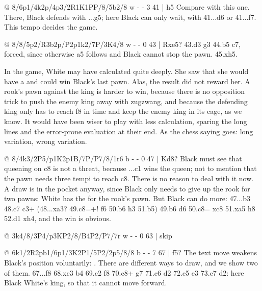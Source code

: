 @ 8/6p1/4k2p/4p3/2R1K1PP/8/5b2/8 w - - 3 41 | h5
Compare  with this one. There, Black defends with ...\K g5; here
Black can only wait, with 41...\K d6 or 41...\K f7. This tempo decides the game.

@ 8/8/5p2/R3b2p/P2p1k2/7P/3K4/8 w - - 0 43 | Rxe5?
43.\K d3 \K g3 44.\R b5 \B c7, forced, since otherwise a5 follows and Black cannot stop the pawn.
45.\R xh5.

In the game, White may have calculated quite deeply. She saw that she would have a
 and could win Black's last
pawn. Alas, the result did not reward her. A rook's pawn against the king is harder to win, because
there is no opposition trick to push the enemy king away with zugzwang, and because the defending
king only has to reach f8 in time and keep the enemy king in its cage, as we know. It would have
been wiser to play with less calculation, sparing the long lines and the error-prone evaluation at
their end. As the chess saying goes: long variation, wrong
variation.

@ 8/4k3/2P5/p1K2p1B/7P/P7/8/1r6 b - - 0 47 | Kd8?
Black must see that queening on c8 is not a threat, because ...\R c1 wins the queen; not to mention
that the pawn needs three tempi to reach c8. There is no reason to deal with it now. A draw is in
the pocket anyway, since Black only needs to give up the rook for two pawns: White has the
 for the rook's pawn.
But Black can do more: 47...\R b3 48.c7 \R c3+ (48...\R xa3? 49.c8=\N+! \K f6 50.\N b6 \R h3
51.\K b5) 49.\K b6 \K d6 50.c8=\Q{} \R xc8 51.\K xa5 \R h8 52.\B d1 \R xh4, and the win is
obvious.

@ 3k4/8/3P4/p3KP2/8/B4P2/P7/7r w - - 0 63 | skip

@ 6k1/2R2pb1/6p1/3K2P1/5P2/2p5/8/8 b - - 7 67 | f5?
The text move weakens Black's position voluntarily:
. There are
different ways to draw, and we show two of them. 67...\B f8 68.\R xc3 \B b4 69.\R c2 \K f8 70.\R c8+
\K g7 71.\R c6 \B d2 72.\K e5 \B e3 73.\R c7 \B d2: here Black
 White's king, so that it cannot move forward.

